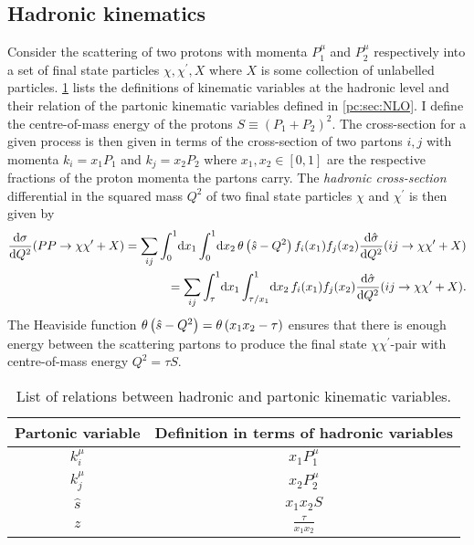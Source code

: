 \documentclass[../main.tex]{subfiles}
\begin{document}
\subsection{Hadronic kinematics}
Consider the scattering of two protons with momenta \(P_1^\mu\) and \(P_2^\mu\) respectively into a set of final state particles \(\chi, \chi^\prime, X\) where \(X\) is some collection of unlabelled particles.
\cref{had:tab:had_kinematic_variables} lists the definitions of kinematic variables at the hadronic level and their relation of the partonic kinematic variables defined in \cref{pc:sec:NLO}.
I define the centre-of-mass energy of the protons \(S \equiv (P_1 + P_2)^2\).
The cross-section for a given process is then given in terms of the cross-section of two partons \(i, j\) with momenta \(k_i = x_1 P_1\) and \(k_j = x_2 P_2\) where \(x_1, x_2 \in [0, 1]\) are the respective fractions of the proton momenta the partons carry.
The \emph{hadronic cross-section} differential in the squared mass \(Q^2\) of two final state particles \(\chi\) and \(\chi^\prime\) is then given by
\begin{align}
  \label{had:eq:dsigma_dQ2}
  \nonumber
  \d[Q^2]{\sigma}(PP \to \chi \chi^\prime + X) = \sum_ {ij} \integral[_0^1]{x_1}\!\integral[_0^1]{x_2} \theta\pclosed{\hat{s} - Q^2} f_i(x_1) f_j(x_2) \d[Q^2]{\hat\sigma}(ij \to \chi\chi^\prime + X) \\
  = \sum_ {ij} \integral[_\tau^1]{x_1}\!\integral[_{\tau/x_1}^1]{x_2} f_i(x_1) f_j(x_2) \d[Q^2]{\hat\sigma}(ij \to \chi\chi^\prime + X).
\end{align}
The Heaviside function \(\theta\left(\hat{s}-Q^2\right) = \theta\left(x_1 x_2 - \tau\right)\) ensures that there is enough energy between the scattering partons to produce the final state \(\chi \chi^\prime\)-pair with centre-of-mass energy \(Q^2 = \tau S\).

\begin{table}[ht!]
  \centering
  \begin{tabular}{|c|c|}
    \hline
    Partonic variable & Definition in terms of hadronic variables \\
    \hline
    \(k_i^\mu\)       & \(x_1 P_1^\mu\)                           \\
    \(k_j^\mu\)       & \(x_2 P_2^\mu\)                           \\
    \(\hat{s}\)       & \(x_1 x_2 S\)                             \\
    \(z\)             & \(\frac{\tau}{x_1x_2}\)                   \\
    \hline
  \end{tabular}
  \caption{List of relations between hadronic and partonic kinematic variables.}
  \label{had:tab:had_kinematic_variables}
\end{table}
\end{document}
